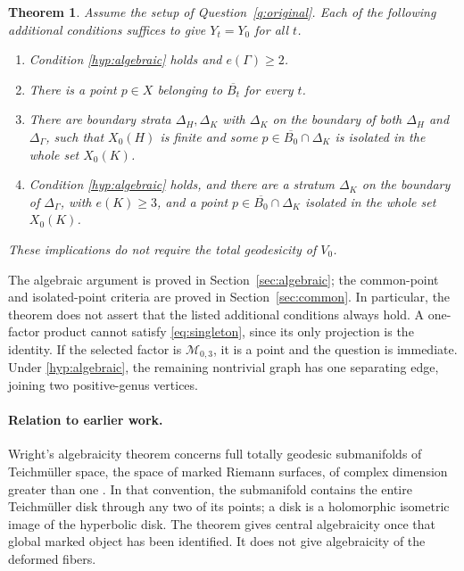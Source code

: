 \documentclass[11pt]{article}
\newcommand{\M}{\mathcal M}
\newcommand{\cl}[1]{\overline{#1}}
\newtheorem{theorem}{Theorem}[section]
\theoremstyle{definition}
\theoremstyle{remark}
\begin{document}
\begin{theorem}\label{thm:main}
Assume the setup of Question~\ref{q:original}. Each of the following additional conditions suffices to give $Y_t=Y_0$ for all $t$.
\begin{enumerate}[label=(\alph*),leftmargin=*]
\item\label{main:edges} Condition \eqref{hyp:algebraic} holds and $e(\Gamma)\geq2$.
\item\label{main:common} There is a point $p\in X$ belonging to $\cl{B_t}$ for every $t$.
\item\label{main:finite} There are boundary strata $\Delta_H,\Delta_K$ with $\Delta_K$ on the boundary of both $\Delta_H$ and $\Delta_\Gamma$, such that $X_0(H)$ is finite and some $p\in\cl{B_0}\cap\Delta_K$ is isolated in the whole set $X_0(K)$.
\item\label{main:deep} Condition \eqref{hyp:algebraic} holds, and there are a stratum $\Delta_K$ on the boundary of $\Delta_\Gamma$, with $e(K)\geq3$, and a point $p\in\cl{B_0}\cap\Delta_K$ isolated in the whole set $X_0(K)$.
\end{enumerate}
These implications do not require the total geodesicity of $V_0$.
\end{theorem}

The algebraic argument is proved in Section~\ref{sec:algebraic}; the common-point and isolated-point criteria are proved in Section~\ref{sec:common}. In particular, the theorem does not assert that the listed additional conditions always hold. A one-factor product cannot satisfy \eqref{eq:singleton}, since its only projection is the identity. If the selected factor is $\M_{0,3}$, it is a point and the question is immediate. Under \eqref{hyp:algebraic}, the remaining nontrivial graph has one separating edge, joining two positive-genus vertices.

\paragraph{Relation to earlier work.}
Wright's algebraicity theorem concerns full totally geodesic submanifolds of Teichm\"uller space, the space of marked Riemann surfaces, of complex dimension greater than one \cite[Theorem~1.1]{Wright}. In that convention, the submanifold contains the entire Teichm\"uller disk through any two of its points; a disk is a holomorphic isometric image of the hyperbolic disk. The theorem gives central algebraicity once that global marked object has been identified. It does not give algebraicity of the deformed fibers.
\end{document}

